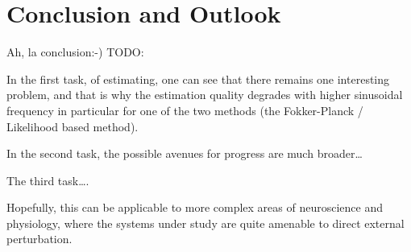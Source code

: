 \documentclass{report}
\begin{document}
\chapter{Conclusion and Outlook}
\label{ch:conclusion}
Ah, la conclusion:-) 
TODO:

In the first task, of estimating, one can see that there remains one interesting
problem, and that is why the estimation quality degrades with higher sinusoidal
frequency in particular for one of the two methods (the
Fokker-Planck / Likelihood based method).

In the second task, the possible avenues for progress are much broader\ldots 

The third task\ldots . 

Hopefully, this can be applicable to more complex areas of neuroscience and
physiology, where the systems under study are quite amenable to direct external
perturbation.

\cleardoublepage
% 


\end{document}
